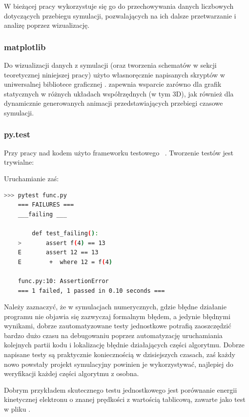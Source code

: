 W bieżącej pracy wykorzystuje się go do przechowywania danych liczbowych
dotyczących przebiegu symulacji, pozwalających na ich dalsze przetwarzanie
i analizę poprzez wizualizację.

\subsubsection{matplotlib}
Do wizualizacji danych z symulacji (oraz tworzenia schematów w sekcji
teoretycznej niniejszej pracy) użyto własnoręcznie napisanych skryptów w
uniwersalnej bibliotece graficznej \cite{matplotlib}.
 zapewnia wsparcie zarówno dla grafik statycznych w różnych układach
współrzędnych (w tym 3D), jak również dla dynamicznie generowanych animacji
przedstawiających przebiegi czasowe symulacji.

\subsubsection{py.test}\label{sec:pytest}
Przy pracy nad kodem użyto frameworku testowego ~\cite{pytest}.
Tworzenie testów jest trywialne:



Uruchamianie zaś:

\begin{lstlisting}[language=Bash]
    >>> pytest func.py
    === FAILURES ===
    ___failing ___

        def test_failing():
    >       assert f(4) == 13
    E       assert 12 == 13
    E        +  where 12 = f(4)

    func.py:10: AssertionError
    === 1 failed, 1 passed in 0.10 seconds ===
\end{lstlisting}

Należy zaznaczyć, że w symulacjach numerycznych, gdzie błędne działanie programu nie
objawia się zazwyczaj formalnym błędem, a jedynie błędnymi
wynikami, dobrze zautomatyzowane testy jednostkowe potrafią zaoszczędzić
bardzo dużo czasu na debugowaniu poprzez automatyzację uruchamiania
kolejnych partii kodu i lokalizację błędnie działających części algorytmu.
Dobrze napisane testy są praktycznie koniecznością w dzisiejszych czasach,
zaś każdy nowo powstały projekt symulacyjny powinien je
wykorzystywać, najlepiej do weryfikacji każdej części algorytmu z osobna.

Dobrym przykładem skutecznego testu jednostkowego jest porównanie energii kinetycznej
elektronu o znanej prędkości z wartością tablicową, zawarte jako test w pliku
.

